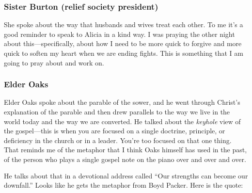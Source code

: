 \subsubsection{Sister Burton (relief society president)}

She spoke about the way that husbands and wives treat each other. To me it's a good reminder to speak to Alicia in a kind way. I was praying the other night about this---specifically, about how I need to be more quick to forgive and more quick to soften my heart when we are ending fights. This is something that I am going to pray about and work on.

\subsubsection{Elder Oaks}

Elder Oaks spoke about the parable of the sower, and he went through Christ's explanation of the parable and then drew parallels to the way we live in the world today and the way we are converted. He talked about the \textit{keyhole} view of the gospel---this is when you are focused on a single doctrine, principle, or deficiency in the church or in a leader. You're too focused on that one thing. That reminds me of the metaphor that I think Oaks himself has used in the past, of the person who plays a single gospel note on the piano over and over and over.

He talks about that in a devotional address called ``Our strengths can become our downfall.'' Looks like he gets the metaphor from Boyd Packer. Here is the quote:

